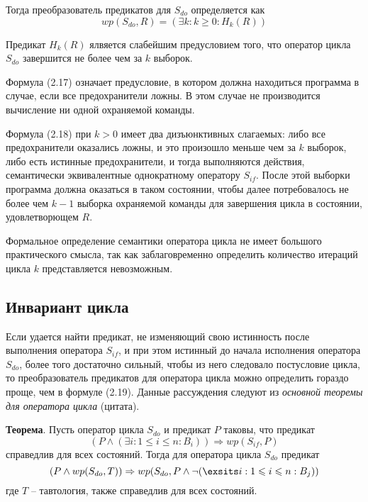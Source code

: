 Тогда преобразователь предикатов для $S_{do}$ определяется как
\begin{equation}
	wp(S_{do}, R) = (\exists k: k \geq 0: H_k(R))
\end{equation}

Предикат $H_k(R)$ ялвяется слабейшим предусловием того, что оператор цикла $S_{do}$ завершится не более
чем за $k$ выборок.

Формула (2.17) означает предусловие, в котором должна находиться программа в случае, если все предохранители ложны.
В этом случае не производится вычисление ни одной охраняемой команды.

Формула (2.18) при $k>0$ имеет два дизъюнктивных слагаемых: либо все предохранители оказались ложны, и это произошло меньше чем за $k$ выборок,
либо есть истинные предохранители, и тогда выполняются действия, семантически эквивалентные однократному оператору $S_{if}$. После этой выборки
программа должна оказаться в таком состоянии, чтобы далее потребовалось не более чем $k - 1$ выборка охраняемой команды для
завершения цикла в состоянии, удовлетворющем $R$.

Формальное определение семантики оператора цикла не имеет большого практического смысла, так как
заблаговременно определить количество итераций цикла $k$ представляется невозможным. 

\subsection{Инвариант цикла}
Если удается найти предикат, не изменяющий свою истинность после выполнения оператора $S_{if}$, и при этом
истинный до начала исполнения оператора $S_{do}$, более того достаточно сильный, чтобы
из него следовало постусловие цикла, то преобразователь предикатов для оператора цикла
можно определить гораздо проще, чем в формуле (2.19). Данные рассуждения следуют из \textit{основной теоремы для оператора цикла} (цитата).

\textbf{Теорема}. Пусть оператор цикла $S_{do}$ и предикат $P$ таковы, что предикат
\begin{equation}
	(P \wedge (\exists i: 1 \leq i \leq n: B_i)) \Rightarrow wp(S_{if}, P)
\end{equation}
справедлив для всех состояний. Тогда для оператора цикла $S_{do}$ предикат
\begin{equation}
	(P \wedge wp(S_{do}, T)) \Rightarrow wp(S_{do}, P \wedge \neg (\exsits i: 1 \leq i \leq n: B_j))
\end{equation}
где $T$ -- тавтология, также справедлив для всех состояний.


